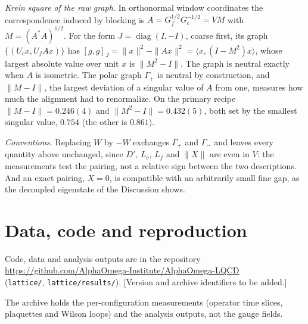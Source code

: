 \documentclass[11pt]{article}
\begin{document}
\emph{Krein square of the raw graph.} In orthonormal window coordinates the correspondence induced by
blocking is $A=G_f^{1/2}G_c^{-1/2}=VM$ with $M=(A^*A)^{1/2}$. For the form $J=\operatorname{diag}(I,-I)$,
coarse first, its graph $\{(U_cx,U_fAx)\}$ has $[g,g]_J=\|x\|^2-\|Ax\|^2=\langle x,(I-M^2)x\rangle$, whose
largest absolute value over unit $x$ is $\|M^2-I\|$. The graph is neutral exactly when $A$ is isometric.
The polar graph $\Gamma_+$ is neutral by construction, and $\|M-I\|$, the largest deviation of a singular
value of $A$ from one, measures how much the alignment had to renormalize. On the primary recipe
$\|M-I\|=0.246(4)$ and $\|M^2-I\|=0.432(5)$, both set by the smallest singular value, $0.754$ (the other is $0.861$).

\emph{Conventions.} Replacing $W$ by $-W$ exchanges $\Gamma_+$ and $\Gamma_-$ and leaves every quantity
above unchanged, since $D'$, $L_c$, $L_f$ and $\|X\|$ are even in $V$: the measurements test the pairing,
not a relative sign between the two descriptions. And an exact pairing, $X=0$, is compatible with an
arbitrarily small fine gap, as the decoupled eigenstate of the Discussion shows.

\section{Data, code and reproduction}\label{app:data}

Code, data and analysis outputs are in the repository\\
\url{https://github.com/AlphaOmega-Institute/AlphaOmega-LQCD}\\
(\texttt{lattice/}, \texttt{lattice/results/}). [Version and archive identifiers to be added.]

The archive holds the per-configuration measurements (operator time slices, plaquettes and Wilson
loops) and the analysis outputs, not the gauge fields.
\end{document}
